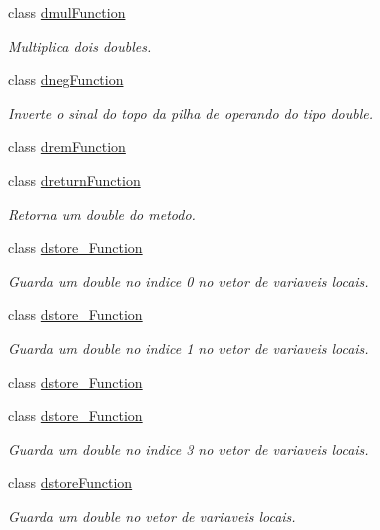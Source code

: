 \begin{DoxyCompactItemize}
class \hyperlink{classInstruction_1_1dmulFunction}{dmul\+Function}
\begin{DoxyCompactList}\small\item\em Multiplica dois doubles. \end{DoxyCompactList}\item 
class \hyperlink{classInstruction_1_1dnegFunction}{dneg\+Function}
\begin{DoxyCompactList}\small\item\em Inverte o sinal do topo da pilha de operando do tipo double. \end{DoxyCompactList}\item 
class \hyperlink{classInstruction_1_1dremFunction}{drem\+Function}
\item 
class \hyperlink{classInstruction_1_1dreturnFunction}{dreturn\+Function}
\begin{DoxyCompactList}\small\item\em Retorna um double do metodo. \end{DoxyCompactList}\item 
class \hyperlink{classInstruction_1_1dstore__0Function}{dstore\+\_\+Function}
\begin{DoxyCompactList}\small\item\em Guarda um double no indice 0 no vetor de variaveis locais. \end{DoxyCompactList}\item 
class \hyperlink{classInstruction_1_1dstore__1Function}{dstore\+\_\+Function}
\begin{DoxyCompactList}\small\item\em Guarda um double no indice 1 no vetor de variaveis locais. \end{DoxyCompactList}\item 
class \hyperlink{classInstruction_1_1dstore__2Function}{dstore\+\_\+Function}
\item 
class \hyperlink{classInstruction_1_1dstore__3Function}{dstore\+\_\+Function}
\begin{DoxyCompactList}\small\item\em Guarda um double no indice 3 no vetor de variaveis locais. \end{DoxyCompactList}\item 
class \hyperlink{classInstruction_1_1dstoreFunction}{dstore\+Function}
\begin{DoxyCompactList}\small\item\em Guarda um double no vetor de variaveis locais. \end{DoxyCompactList}\item 

\end{DoxyCompactItemize}

